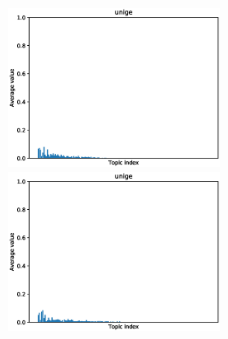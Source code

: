 \begin{figure}[ht]
    \centering
    \includegraphics[width=0.5\textwidth]{images/similarity_graphs/non-filtered/unige.eps}%
    \hfill
    \includegraphics[width=0.5\textwidth]{images/similarity_graphs/filtered/unige.eps}
\end{figure}